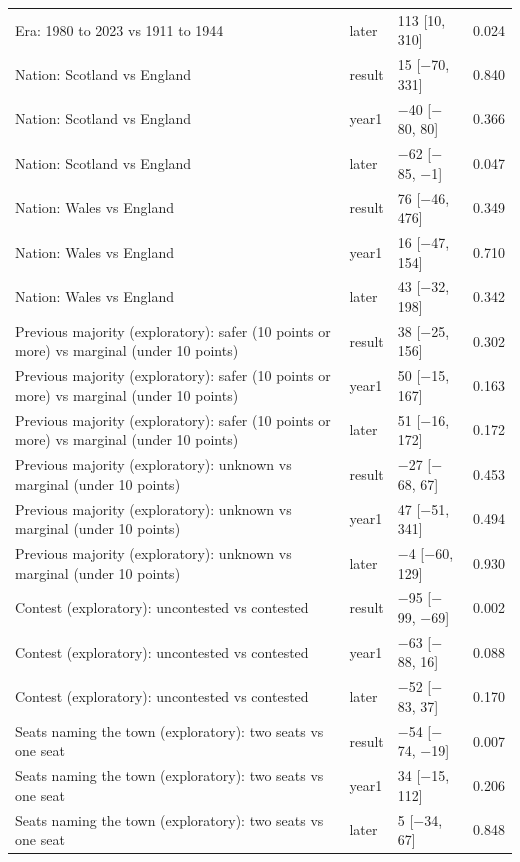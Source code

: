 \documentclass[11pt,a4paper]{article}
\begin{document}
\begin{table}[tbp]
\begin{tabular}{p{9.5cm}lll}
Era: 1980 to 2023 vs 1911 to 1944 & later & 113 [10, 310] & 0.024\\
Nation: Scotland vs England & result & 15 [$-$70, 331] & 0.840\\
Nation: Scotland vs England & year1 & $-$40 [$-$80, 80] & 0.366\\
Nation: Scotland vs England & later & $-$62 [$-$85, $-$1] & 0.047\\
Nation: Wales vs England & result & 76 [$-$46, 476] & 0.349\\
Nation: Wales vs England & year1 & 16 [$-$47, 154] & 0.710\\
Nation: Wales vs England & later & 43 [$-$32, 198] & 0.342\\
Previous majority (exploratory): safer (10 points or more) vs marginal (under 10 points) & result & 38 [$-$25, 156] & 0.302\\
Previous majority (exploratory): safer (10 points or more) vs marginal (under 10 points) & year1 & 50 [$-$15, 167] & 0.163\\
Previous majority (exploratory): safer (10 points or more) vs marginal (under 10 points) & later & 51 [$-$16, 172] & 0.172\\
Previous majority (exploratory): unknown vs marginal (under 10 points) & result & $-$27 [$-$68, 67] & 0.453\\
Previous majority (exploratory): unknown vs marginal (under 10 points) & year1 & 47 [$-$51, 341] & 0.494\\
Previous majority (exploratory): unknown vs marginal (under 10 points) & later & $-$4 [$-$60, 129] & 0.930\\
Contest (exploratory): uncontested vs contested & result & $-$95 [$-$99, $-$69] & 0.002\\
Contest (exploratory): uncontested vs contested & year1 & $-$63 [$-$88, 16] & 0.088\\
Contest (exploratory): uncontested vs contested & later & $-$52 [$-$83, 37] & 0.170\\
Seats naming the town (exploratory): two seats vs one seat & result & $-$54 [$-$74, $-$19] & 0.007\\
Seats naming the town (exploratory): two seats vs one seat & year1 & 34 [$-$15, 112] & 0.206\\
Seats naming the town (exploratory): two seats vs one seat & later & 5 [$-$34, 67] & 0.848\\
\bottomrule\end{tabular}\end{table}
\end{document}
